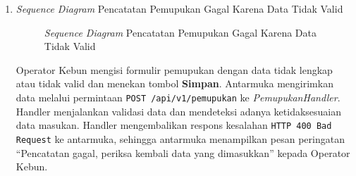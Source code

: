 \documentclass[a4paper,11pt]{article}
\begin{document}
\begin{enumerate}
    \textbf{Penjelasan Alur:}
    \begin{itemize}
        \item \textbf{Aksi Awal:} Operator mengisi parameter pohon dan pupuk pada formulir lalu menekan tombol \textbf{Simpan}.
        \item \textbf{Alur Backend:} Antarmuka mengirim request \texttt{POST /api/v1/pemupukan}. Setelah sukses, antarmuka mengirim request pengurangan stok \texttt{PATCH /api/v1/stok/pupuk/:id}.
        \item \textbf{Akses Data:} Usecase pemupukan menyimpan data pencatatan ke database, kemudian usecase stok memperbarui sisa volume pupuk di database.
        \item \textbf{Output:} Catatan tersimpan dengan sukses dan stok pupuk berkurang sesuai jumlah pemakaian.
    \end{itemize}

    \item \textit{Sequence Diagram} Pencatatan Pemupukan Gagal Karena Data Tidak Valid
    \begin{figure}[H]
        \centering
        \caption{\textit{Sequence Diagram} Pencatatan Pemupukan Gagal Karena Data Tidak Valid}
        \label{fig:sd-pemupukan-invalid}
    \end{figure}

    \hspace{1em} Operator Kebun mengisi formulir pemupukan dengan data tidak lengkap atau tidak valid dan menekan tombol \textbf{Simpan}. Antarmuka mengirimkan data melalui permintaan \texttt{POST /api/v1/pemupukan} ke \textit{PemupukanHandler}. Handler menjalankan validasi data dan mendeteksi adanya ketidaksesuaian data masukan. Handler mengembalikan respons kesalahan \texttt{HTTP 400 Bad Request} ke antarmuka, sehingga antarmuka menampilkan pesan peringatan ``Pencatatan gagal, periksa kembali data yang dimasukkan'' kepada Operator Kebun.


\end{enumerate}
\end{document}
